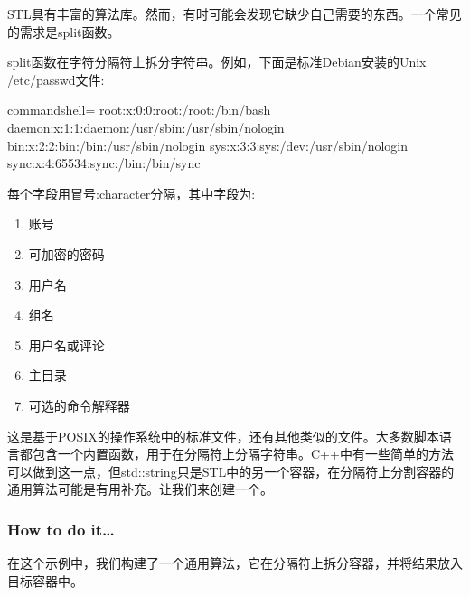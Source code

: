 
STL具有丰富的算法库。然而，有时可能会发现它缺少自己需要的东西。一个常见的需求是split函数。

split函数在字符分隔符上拆分字符串。例如，下面是标准Debian安装的Unix /etc/passwd文件:

\begin{tcblisting}{commandshell={}}
root:x:0:0:root:/root:/bin/bash
daemon:x:1:1:daemon:/usr/sbin:/usr/sbin/nologin
bin:x:2:2:bin:/bin:/usr/sbin/nologin
sys:x:3:3:sys:/dev:/usr/sbin/nologin
sync:x:4:65534:sync:/bin:/bin/sync
\end{tcblisting}

每个字段用冒号:character分隔，其中字段为:


\begin{enumerate}
\item 
账号

\item 
可加密的密码

\item 
用户名

\item 
组名

\item 
用户名或评论

\item 
主目录

\item 
可选的命令解释器
\end{enumerate}

这是基于POSIX的操作系统中的标准文件，还有其他类似的文件。大多数脚本语言都包含一个内置函数，用于在分隔符上分隔字符串。C++中有一些简单的方法可以做到这一点，但std::string只是STL中的另一个容器，在分隔符上分割容器的通用算法可能是有用补充。让我们来创建一个。

\subsubsection{How to do it…}

在这个示例中，我们构建了一个通用算法，它在分隔符上拆分容器，并将结果放入目标容器中。

